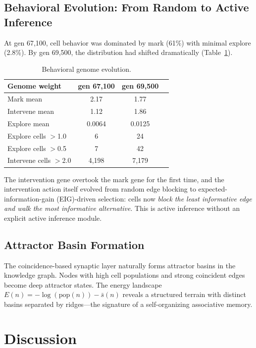 \documentclass[aps,prl,reprint]{revtex4-2}
\begin{document}
\subsection{Behavioral Evolution: From Random to Active Inference}

At gen 67,100, cell behavior was dominated by mark (61\%) with minimal explore
(2.8\%). By gen 69,500, the distribution had shifted dramatically
(Table~\ref{tab:behavior}).

\begin{table}[h]
\centering
\caption{Behavioral genome evolution.}
\label{tab:behavior}
\begin{tabular}{lccc}
\toprule
Genome weight & gen 67,100 & gen 69,500 \\
\midrule
Mark mean & 2.17 & 1.77 \\
Intervene mean & 1.12 & 1.86 \\
Explore mean & 0.0064 & 0.0125 \\
Explore cells $>$1.0 & 6 & 24 \\
Explore cells $>$0.5 & 7 & 42 \\
Intervene cells $>$2.0 & 4,198 & 7,179 \\
\bottomrule
\end{tabular}
\end{table}

The intervention gene overtook the mark gene for the first time, and the
intervention action itself evolved from random edge blocking to
expected-information-gain (EIG)-driven selection: cells now \emph{block
the least informative edge and walk the most informative alternative}. This
is active inference without an explicit active inference module.

\subsection{Attractor Basin Formation}

The coincidence-based synaptic layer naturally forms attractor basins in the
knowledge graph. Nodes with high cell populations and strong coincident edges
become deep attractor states. The energy landscape $E(n) = -\log(\text{pop}(n))
- \bar{s}(n)$ reveals a structured terrain with distinct basins separated by
ridges---the signature of a self-organizing associative memory.

\section{Discussion}
\end{document}
